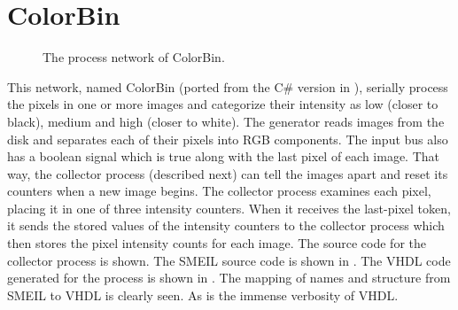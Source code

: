 \section{ColorBin}
\label{sec:colorbin}
\begin{figure}%
  \centering
  \caption{The process network of ColorBin.}
  \label{net:colorbin}
\end{figure}


This network, named ColorBin (ported from the C\# version in
\cite{skovhede2017c++}), serially process the pixels in one or more images and
categorize their intensity as low (closer to black), medium and high (closer to
white). The generator reads images from the disk and separates each of their
pixels into RGB components. The input bus also has a boolean signal which is
true along with the last pixel of each image. That way, the collector process
(described next) can tell the images apart and reset its counters when a new
image begins. The collector process examines each pixel, placing it in one of
three intensity counters. When it receives the last-pixel token, it sends the
stored values of the intensity counters to the collector process which then
stores the pixel intensity counts for each image. The source code for the
collector process is shown. The SMEIL source code is shown in
. The VHDL code generated for the process is shown in
. The mapping of names and structure from SMEIL to VHDL is
clearly seen. As is the immense verbosity of VHDL.

